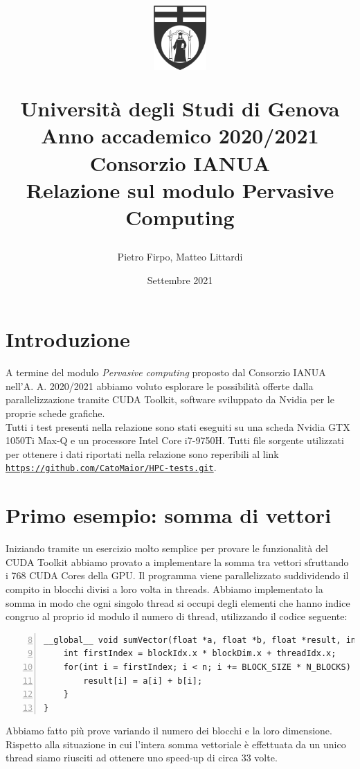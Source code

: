 \documentclass[a4paper,11pt]{article}
\title{
    \vspace{-1.6cm}
    \begin{center}
        \includegraphics[width=2cm]{logo_bn.png}
    \end{center}
    \vspace{0.6cm}
    \textbf{Università degli Studi di Genova}\\
    \vspace{0.2cm}
    \textbf{Anno accademico 2020/2021}\\
    \vspace{0.6cm}
    \Large
    Consorzio IANUA\\
    \vspace{0.2cm}
    Relazione sul modulo Pervasive Computing
}
\author{Pietro Firpo, Matteo Littardi}
\date{Settembre 2021}
\begin{document}
\maketitle
\thispagestyle{Titolo}


\section{Introduzione}
A termine del modulo \textit{Pervasive computing} proposto dal Consorzio IANUA nell'A. A. 2020/2021 abbiamo voluto esplorare le possibilità offerte dalla parallelizzazione tramite CUDA Toolkit, software sviluppato da Nvidia per le proprie schede grafiche. \\
Tutti i test presenti nella relazione sono stati eseguiti su una scheda Nvidia GTX 1050Ti Max-Q e un processore Intel Core i7-9750H. Tutti file sorgente utilizzati per ottenere i dati riportati nella relazione sono reperibili al link \href{https://github.com/CatoMaior/HPC-tests.git}{\texttt{https://github.com/CatoMaior/HPC-tests.git}}.

\section{Primo esempio: somma di vettori}
Iniziando tramite un esercizio molto semplice per provare le funzionalità del CUDA Toolkit abbiamo provato a implementare la somma tra vettori sfruttando i 768 CUDA Cores della GPU. Il programma viene parallelizzato suddividendo il compito in blocchi divisi a loro volta in threads. Abbiamo implementato la somma in modo che ogni singolo thread si occupi degli elementi che hanno indice congruo al proprio id modulo il numero di thread, utilizzando il codice seguente:

\begin{Verbatim}[numbers=left, frame=single, firstnumber=8]
__global__ void sumVector(float *a, float *b, float *result, int n) {
    int firstIndex = blockIdx.x * blockDim.x + threadIdx.x;
    for(int i = firstIndex; i < n; i += BLOCK_SIZE * N_BLOCKS) {
        result[i] = a[i] + b[i];
    }
}
\end{Verbatim}

Abbiamo fatto più prove variando il numero dei blocchi e la loro dimensione. Rispetto alla situazione in cui l'intera somma vettoriale è effettuata da un unico thread siamo riusciti ad ottenere uno speed-up di circa 33 volte. 
\end{document}
